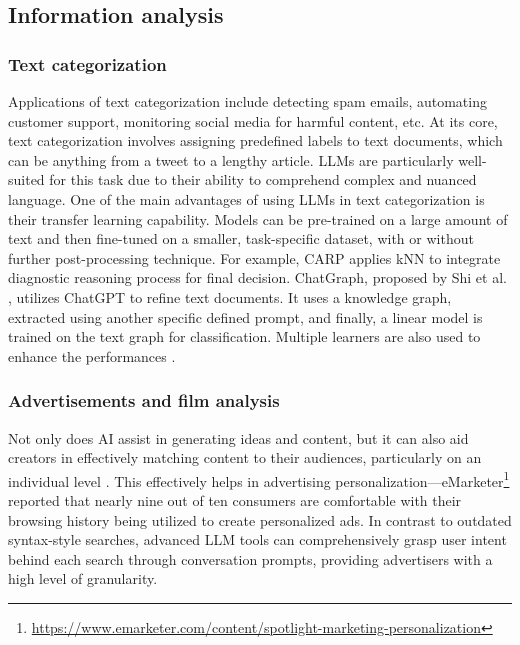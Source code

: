 \documentclass[11pt,a4paper]{article}
\begin{document}




\subsection{Information analysis}

\subsubsection{Text categorization}

Applications of text categorization include detecting spam emails, automating customer support, monitoring social media for harmful content, etc. At its core, text categorization involves assigning predefined labels to text documents, which can be anything from a tweet to a lengthy article. LLMs are particularly well-suited for this task due to their ability to comprehend complex and nuanced language. One of the main advantages of using LLMs in text categorization is their transfer learning capability. Models can be pre-trained on a large amount of text and then fine-tuned on a smaller, task-specific dataset, with or without further post-processing technique. For example, CARP \cite{sun:text:2023} applies kNN to integrate diagnostic reasoning process for final decision. ChatGraph, proposed by Shi et al. \cite{shi:chatgraph:2023}, utilizes ChatGPT to refine text documents. It uses a knowledge graph, extracted using another specific defined prompt, and finally, a linear model is trained on the text graph for classification. Multiple learners are also used to enhance the performances \cite{Hou:promptboosting:2023}.%

\subsubsection{Advertisements and film analysis}

Not only does AI assist in generating ideas and content, but it can also aid creators in effectively matching content to their audiences, particularly on an individual level \cite{feizi:Online:2023}. This effectively helps in advertising personalization—eMarketer\footnote{\url{https://www.emarketer.com/content/spotlight-marketing-personalization}} reported that nearly nine out of ten consumers are comfortable with their browsing history being utilized to create personalized ads. In contrast to outdated syntax-style searches, advanced LLM tools can comprehensively grasp user intent behind each search through conversation prompts, providing advertisers with a high level of granularity.
\end{document}

